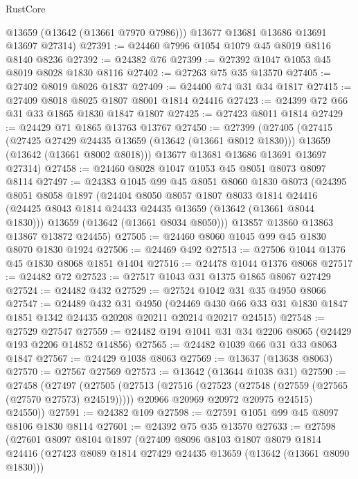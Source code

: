 \begin{lexlean}{RustCore}
\begin{coremodule}
        @13659
        (@13642 (@13661 @7970 @7986)))
      @13677
      @13681
      @13686
      @13691
      @13697
      @27314)
@27391 := @24460 @7996 @1054 @1079 @45 @8019 @8116 @8140 @8236
@27392 := @24382 @76
@27399 := @27392 @1047 @1053 @45 @8019 @8028 @1830 @8116
@27402 := @27263 @75 @35 @13570
@27405 := @27402 @8019 @8026 @1837
@27409 := @24400 @74 @31 @34 @1817
@27415 := @27409 @8018 @8025 @1807 @8001 @1814 @24416
@27423 := @24399 @72 @66 @31 @33 @1865 @1830 @1847 @1807
@27425 := @27423 @8011 @1814
@27429 := @24429 @71 @1865 @13763 @13767
@27450 := @27399
    (@27405
      (@27415
        (@27425 @27429 @24435 @13659 (@13642 (@13661 @8012 @1830)))
        @13659
        (@13642 (@13661 @8002 @8018)))
      @13677
      @13681
      @13686
      @13691
      @13697
      @27314)
@27458 := @24460 @8028 @1047 @1053 @45 @8051 @8073 @8097 @8114
@27497 := @24383
    @1045
    @99
    @45
    @8051
    @8060
    @1830
    @8073
    (@24395
      @8051
      @8058
      @1897
      (@24404
        @8050
        @8057
        @1807
        @8033
        @1814
        @24416
        (@24425 @8043 @1814 @24433 @24435 @13659 (@13642 (@13661 @8044 @1830)))
        @13659
        (@13642 (@13661 @8034 @8050)))
      @13857
      @13860
      @13863
      @13867
      @13872
      @24455)
@27505 := @24460 @8060 @1045 @99 @45 @1830 @8070 @1830 @1924
@27506 := @24469 @492
@27513 := @27506 @1044 @1376 @45 @1830 @8068 @1851 @1404
@27516 := @24478 @1044 @1376 @8068
@27517 := @24482 @72
@27523 := @27517 @1043 @31 @1375 @1865 @8067 @27429
@27524 := @24482 @432
@27529 := @27524 @1042 @31 @35 @4950 @8066
@27547 := @24489
    @432
    @31
    @4950
    (@24469 @430 @66 @33 @31 @1830 @1847 @1851 @1342 @24435 @20208 @20211 @20214 @20217 @24515)
@27548 := @27529 @27547
@27559 := @24482 @194 @1041 @31 @34 @2206 @8065 (@24429 @193 @2206 @14852 @14856)
@27565 := @24482 @1039 @66 @31 @33 @8063 @1847
@27567 := @24429 @1038 @8063
@27569 := @13637 (@13638 @8063)
@27570 := @27567 @27569
@27573 := @13642 (@13644 @1038 @31)
@27590 := @27458
    (@27497
      (@27505
        (@27513
          (@27516 (@27523 (@27548 (@27559 (@27565 (@27570 @27573) @24519)))))
          @20966
          @20969
          @20972
          @20975
          @24515)
        @24550))
@27591 := @24382 @109
@27598 := @27591 @1051 @99 @45 @8097 @8106 @1830 @8114
@27601 := @24392 @75 @35 @13570
@27633 := @27598
    (@27601
      @8097
      @8104
      @1897
      (@27409
        @8096
        @8103
        @1807
        @8079
        @1814
        @24416
        (@27423 @8089 @1814 @27429 @24435 @13659 (@13642 (@13661 @8090 @1830)))

\end{coremodule}
\end{lexlean}
